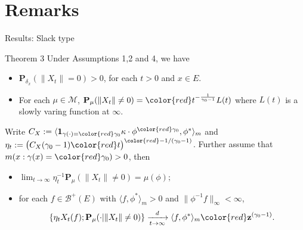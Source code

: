 \documentclass[xcolor=dvipsnames]{beamer}
\begin{document}
\section{Remarks}
\begin{frame}{Results: Slack type}
\begin{block}{Theorem 3}
Under Assumptions 1,2 and 4, we have
\begin{itemize}
\item[(1)]
  $\mathbf P_{\delta_x}( \| X_t\| = 0) > 0$, for each $t > 0$ and $x\in E$.
\item[(2)]
  For each $\mu \in \mathcal M$, $\mathbf P_{\mu}(\|X_t\| \neq 0) = {\color{red} t^{-\frac{1}{\gamma_0 - 1}}} L(t)$ where $L(t)$ is a slowly varing function at $\infty$.
\end{itemize}
Write $C_X := \langle \mathbf 1_{\gamma(\cdot) = {\color{red} \gamma_0}} \kappa\cdot \phi^{ \color{red} \gamma_0}, \phi^* \rangle_m$ and $\eta_t := \big( C_X(\gamma_0 - 1) {\color{red} t} \big)^{\color{red} - 1/(\gamma_0 - 1) }$. 
{\color{red} Further assume} that $m( x:\gamma(x)={\color{red}\gamma_0} )>0$, then
\begin{itemize}
\item[(3)]
$
  \lim_{t\to\infty} \eta_t^{-1}\mathbf P_{\mu}(\|X_t\| \neq 0)
  =\mu(\phi);
$
\item[(4)]
  for each $f \in \mathscr B^+(E)$ with $\langle f, \phi^* \rangle_m > 0$ and $\| \phi^{-1}f \|_\infty < \infty$,
\[
  \{\eta_t X_t(f) ; \mathbf P_{\mu}(\cdot |\|X_t\| \neq 0) \}
  \xrightarrow[t\to \infty]{d} \langle f, \phi^*\rangle_m {\color{red}\mathbf z^{(\gamma_0 - 1)}}.
\]
\end{itemize}
\end{block}
\end{frame}
\end{document}
